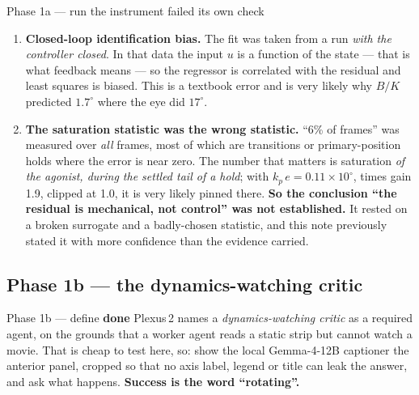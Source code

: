 \documentclass[11pt,a4paper]{article}
\newcommand{\dn}{\textcolor{good}{\textbf{done}}}
\begin{document}
\begin{runbox}{Phase 1a --- run \hfill the instrument failed its own check}
\begin{enumerate}
\item \textbf{Closed-loop identification bias.} The fit was taken from a run \emph{with the
controller closed}. In that data the input $u$ is a function of the state --- that is what feedback
means --- so the regressor is correlated with the residual and least squares is biased. This is a
textbook error and is very likely why $B/K$ predicted $1.7^\circ$ where the eye did $17^\circ$.
\item \textbf{The saturation statistic was the wrong statistic.} ``6\% of frames'' was measured over
\emph{all} frames, most of which are transitions or primary-position holds where the error is near
zero. The number that matters is saturation \emph{of the agonist, during the settled tail of a
hold}; with $k_p\,e = 0.11\times10^\circ$, times gain 1.9, clipped at 1.0, it is very likely pinned
there. \textbf{So the conclusion ``the residual is mechanical, not control'' was not established.}
It rested on a broken surrogate and a badly-chosen statistic, and this note previously stated it
with more confidence than the evidence carried.
\end{enumerate}
\end{runbox}

\subsection{Phase 1b --- the dynamics-watching critic}

\begin{phasebox}{Phase 1b --- define \hfill \dn}
Plexus\,2 names a \emph{dynamics-watching critic} as a required agent, on the grounds that a worker
agent reads a static strip but cannot watch a movie. That is cheap to test here, so: show the local
Gemma-4-12B captioner the anterior panel, cropped so that no axis label, legend or title can leak
the answer, and ask what happens. \textbf{Success is the word ``rotating''.}
\end{phasebox}
\end{document}
